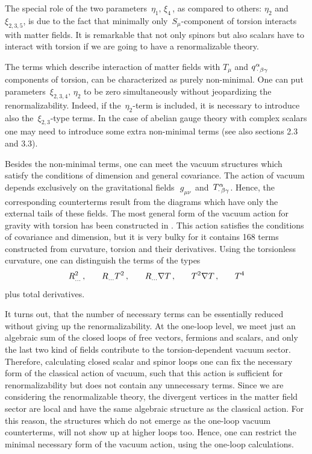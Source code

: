The special role of the two parameters $\,\eta_1,\,\xi_4\,$, 
as compared to others: $\eta_2$ and $\xi_{2,3,5}$, 
is due to the fact that minimally only $\,S_{\mu}$-component 
of torsion interacts with matter fields. It is remarkable
that not only spinors but also scalars have to interact 
with torsion if we are going to have a renormalizable 
theory. 

The terms which describe interaction 
of matter fields with $T_\mu$ and $q^\alpha_{\,\cdot\,\beta\gamma}$ 
components of torsion, can be characterized as purely 
non-minimal. One can put parameters 
$\,\xi_{2,3,4},\,\eta_2$ to be zero simultaneously without
jeopardizing the renormalizability. Indeed, if the 
$\,\eta_2$-term is included, it is necessary to introduce 
also the $\,\xi_{2,3}$-type terms. In the case of abelian 
gauge theory with complex scalars one may need to 
introduce some extra non-minimal terms \cite{bush2}
(see also sections 2.3 and 3.3). 

Besides the non-minimal terms, one can meet 
the vacuum structures which satisfy the conditions 
of dimension and general covariance. The action of 
vacuum depends exclusively on the gravitational fields 
$\,\,g_{\mu\nu}\,$ and $\,T^\alpha_{\cdot\,\beta\gamma}$.
Hence, the corresponding counterterms result from the
diagrams which have only the external tails of 
these fields. The most general form of the vacuum action 
for gravity with torsion has been constructed in \cite{chris}. 
This action satisfies the conditions of covariance and 
dimension, but it is very bulky for it contains 168 terms 
constructed from curvature, torsion and their derivatives. 
Using the torsionless curvature, one can distinguish 
the terms of the types 
$$
R_{...}^2 \,,\,\,\,\,\,\,\,\,\,\,\, R_{...}T^2
\,,\,\,\,\,\,\,\,\,\,\,\,R_{...}\nabla T
\,,\,\,\,\,\,\,\,\,\,\,\,
T^2\nabla T\,,\,\,\,\,\,\,\,\,\,\,\,T^4
$$
plus total derivatives. 

It turns out, that the number of necessary 
terms can be essentially reduced without giving up the 
renormalizability. At the one-loop level, we meet just an 
algebraic sum of the closed loops of free vectors,
fermions and scalars, and only the last two kind of 
fields contribute to the torsion-dependent vacuum sector. 
Therefore, calculating closed scalar and spinor loops 
one can fix the necessary form of the classical action of 
vacuum, such that this action is sufficient for 
renormalizability but does not contain any unnecessary 
terms. Since we are considering the renormalizable 
theory, the divergent vertices in the matter field 
sector are local and have the same algebraic structure 
as the classical action. For this reason, the structures 
which do not emerge as the one-loop vacuum counterterms, will 
not show up at higher loops too. Hence, one can 
restrict the minimal necessary form of the vacuum  
action, using the one-loop calculations.

